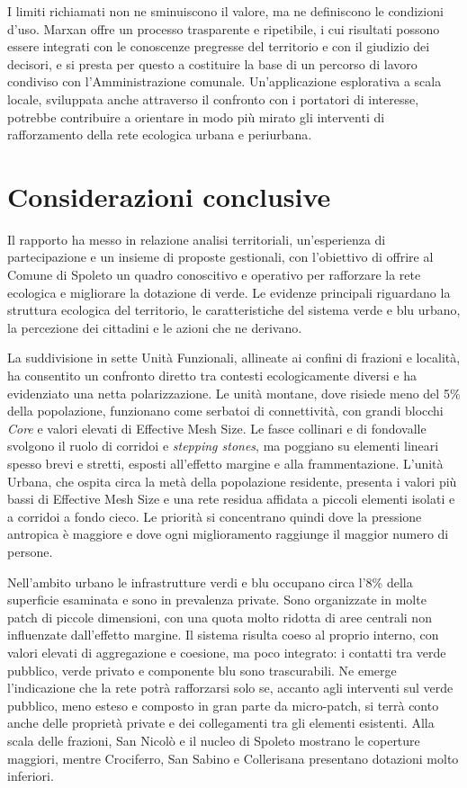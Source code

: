 \documentclass[
  a4paper,
]{book}
\begin{document}
I limiti richiamati non ne sminuiscono il valore, ma ne definiscono le condizioni d'uso.
Marxan offre un processo trasparente e ripetibile, i cui risultati possono essere integrati con le conoscenze pregresse del territorio e con il giudizio dei decisori, e si presta per questo a costituire la base di un percorso di lavoro condiviso con l'Amministrazione comunale.
Un'applicazione esplorativa a scala locale, sviluppata anche attraverso il confronto con i portatori di interesse, potrebbe contribuire a orientare in modo più mirato gli interventi di rafforzamento della rete ecologica urbana e periurbana.

\chapter{Considerazioni conclusive}\label{considerazioni-conclusive-1}

Il rapporto ha messo in relazione analisi territoriali, un'esperienza di partecipazione e un insieme di proposte gestionali, con l'obiettivo di offrire al Comune di Spoleto un quadro conoscitivo e operativo per rafforzare la rete ecologica e migliorare la dotazione di verde. Le evidenze principali riguardano la struttura ecologica del territorio, le caratteristiche del sistema verde e blu urbano, la percezione dei cittadini e le azioni che ne derivano.

La suddivisione in sette Unità Funzionali, allineate ai confini di frazioni e località, ha consentito un confronto diretto tra contesti ecologicamente diversi e ha evidenziato una netta polarizzazione. Le unità montane, dove risiede meno del 5\% della popolazione, funzionano come serbatoi di connettività, con grandi blocchi \emph{Core} e valori elevati di Effective Mesh Size. Le fasce collinari e di fondovalle svolgono il ruolo di corridoi e \emph{stepping stones}, ma poggiano su elementi lineari spesso brevi e stretti, esposti all'effetto margine e alla frammentazione. L'unità Urbana, che ospita circa la metà della popolazione residente, presenta i valori più bassi di Effective Mesh Size e una rete residua affidata a piccoli elementi isolati e a corridoi a fondo cieco. Le priorità si concentrano quindi dove la pressione antropica è maggiore e dove ogni miglioramento raggiunge il maggior numero di persone.

Nell'ambito urbano le infrastrutture verdi e blu occupano circa l'8\% della superficie esaminata e sono in prevalenza private. Sono organizzate in molte patch di piccole dimensioni, con una quota molto ridotta di aree centrali non influenzate dall'effetto margine. Il sistema risulta coeso al proprio interno, con valori elevati di aggregazione e coesione, ma poco integrato: i contatti tra verde pubblico, verde privato e componente blu sono trascurabili. Ne emerge l'indicazione che la rete potrà rafforzarsi solo se, accanto agli interventi sul verde pubblico, meno esteso e composto in gran parte da micro-patch, si terrà conto anche delle proprietà private e dei collegamenti tra gli elementi esistenti. Alla scala delle frazioni, San Nicolò e il nucleo di Spoleto mostrano le coperture maggiori, mentre Crociferro, San Sabino e Collerisana presentano dotazioni molto inferiori.
\end{document}
